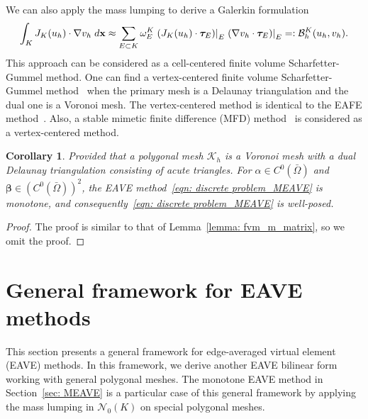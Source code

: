 \documentclass[a4paper]{article}
\theoremstyle{plain}
\newtheorem{corollary}[theorem]{Corollary}
\theoremstyle{definition}
\numberwithin{equation}{section}
\newcommand{\bx}{{\bf x}}
\newcommand{\Kh}{\mathcal{K}_h}
\begin{document}
We can also apply the mass lumping to derive a Galerkin formulation 
\begin{equation*}
\int_K J_K(u_h)\cdot\nabla v_h\;{\rm d}\bx\approx \sum_{E\subset K}\omega_E^K \left.(J_K(u_h)\cdot\bm{\tau}_E)\right|_E\left.(\nabla v_h\cdot\bm{\tau}_E)\right|_E=:\mathcal{B}_h^K(u_h,v_h).
\end{equation*}
This approach can be considered as a cell-centered finite volume Scharfetter-Gummel method.
One can find a vertex-centered finite volume Scharfetter-Gummel method~\cite{bank1998finite} when the primary mesh is a Delaunay triangulation and the dual one is a Voronoi mesh.
The vertex-centered method is identical to the EAFE method~\cite{LAZ05,XU99}.
Also, a stable mimetic finite difference (MFD) method~\cite{adler2022stable} is considered as a vertex-centered method.



\begin{corollary}\label{lemma: MEAVE_monotone}
Provided that a polygonal mesh $\Kh$ is a Voronoi mesh with a dual Delaunay triangulation consisting of acute triangles.
For $\alpha\in C^0(\bar{\Omega})$ and $\bm{\beta}\in(C^0(\bar{\Omega}))^2$, the EAVE method~\eqref{eqn: discrete problem_MEAVE} is monotone, and consequently~\eqref{eqn: discrete problem_MEAVE} is well-posed.
\end{corollary}
\begin{proof}
The proof is similar to that of Lemma~\ref{lemma: fvm_m_matrix}, so we omit the proof.
\end{proof}






\section{General framework for EAVE methods}\label{sec:EAVE}

This section presents a general framework for edge-averaged virtual element (EAVE) methods.
In this framework, we derive another EAVE bilinear form working with general polygonal meshes.
The monotone EAVE method in Section~\ref{sec: MEAVE} is a particular case of this general framework by applying the mass lumping in $\mathcal{N}_0(K)$ on special polygonal meshes.
\end{document}

